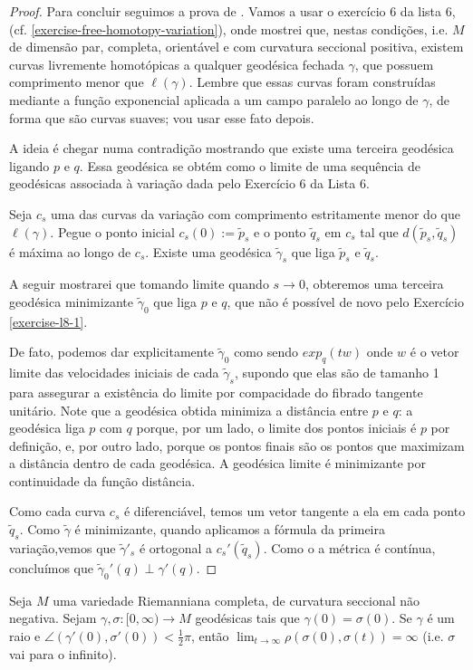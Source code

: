 \begin{proof}
Para concluir seguimos a prova de \cite{doc}. Vamos a usar o exercício 6 da
lista 6, (cf. \ref{exercise-free-homotopy-variation}), onde mostrei que, nestas condições, i.e.
$M$ de dimensão par, completa, orientável e com curvatura seccional positiva,
existem curvas livremente homotópicas a qualquer geodésica fechada $\gamma$, que
possuem comprimento menor que $\ell(\gamma)$. Lembre que essas curvas foram
construídas mediante a função exponencial aplicada a um campo paralelo ao longo
de $\gamma$, de forma que são curvas suaves; vou usar esse fato depois.

A ideia é chegar numa contradição mostrando que existe uma terceira geodésica
ligando $p$ e $q$. Essa geodésica se obtém como o limite de uma sequência de
geodésicas associada à variação dada pelo Exercício 6 da Lista 6.

Seja $c_s$ uma das curvas da variação com comprimento estritamente
menor do que $\ell(\gamma)$. Pegue o ponto inicial $c_s(0):=\tilde{p}_s$ e o 
ponto $\tilde{q}_s$ em $c_s$ tal que $d(\tilde{p}_s,\tilde{q}_s)$ é máxima ao 
longo de $c_s$. Existe uma geodésica $\tilde{\gamma}_s$ que liga 
$\tilde{p}_s$ e $\tilde{q}_s$.

A seguir mostrarei que tomando limite quando $s \to 0$, obteremos uma terceira
geodésica minimizante $\tilde{\gamma}_0$ que liga $p$ e $q$, que não é possível
de novo pelo Exercício \ref{exercise-l8-1}.

De fato, podemos dar explicitamente $\tilde{\gamma}_0$ como sendo $exp_q(tw)$
onde $w$ é o vetor limite das velocidades iniciais de cada $\tilde{\gamma}_s$,
supondo que elas são de tamanho 1 para assegurar a existência do limite por
compacidade do fibrado tangente unitário. Note que a geodésica obtida minimiza a
distância entre $p$ e $q$: a geodésica liga $p$ com  $q$ porque, por um lado, o
limite dos pontos iniciais é $p$ por definição, e, por outro lado, porque os
pontos finais são os pontos que maximizam a distância dentro de cada geodésica.
A geodésica limite é minimizante por continuidade da função distância.

Como cada curva $c_s$ é diferenciável, temos um vetor tangente a ela em cada
ponto $\tilde{q}_s$. Como $\tilde{\gamma}$ é minimizante, quando aplicamos a
fórmula da primeira variação,vemos que $\tilde{\gamma}'_s$ é ortogonal a
$c_s'(\tilde{q}_s)$. Como o a métrica é contínua, concluímos que
$\tilde{\gamma}_0'(q) \perp \gamma'(q)$.
\end{proof}

\begin{exercise}
\label{exercise-l8-11}
Seja $M$ uma variedade Riemanniana completa, de curvatura seccional não
negativa. Sejam $\gamma,\sigma:[0,\infty) \to M$ geodésicas tais que
$\gamma(0)=\sigma(0)$. Se $\gamma$ é um raio e
$\angle(\gamma'(0),\sigma'(0))<\frac{1}{2}\pi$, então $\lim_{t \to \infty}
\rho(\sigma(0),\sigma(t))=\infty$ (i.e. $\sigma$ vai para o infinito).
\end{exercise}

